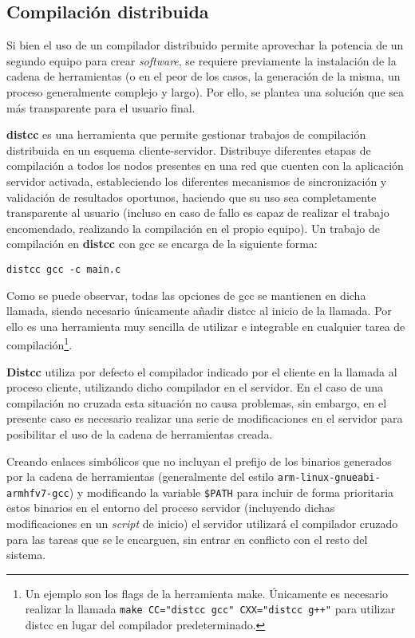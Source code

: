 \subsection{Compilación distribuida}

Si bien el uso de un compilador distribuido permite aprovechar la potencia de un segundo equipo para crear \textit{software}, se requiere previamente la instalación de la cadena de herramientas (o en el peor de los casos, la generación de la misma, un proceso generalmente complejo y largo). Por ello, se plantea una solución que sea más transparente para el usuario final.

\textbf{distcc} es una herramienta que permite gestionar trabajos de compilación distribuida en un esquema cliente-servidor. Distribuye diferentes etapas de compilación a todos los nodos presentes en una red que cuenten con la aplicación servidor activada, estableciendo los diferentes mecanismos de sincronización y validación de resultados oportunos, haciendo que su uso sea completamente transparente al usuario (incluso en caso de fallo es capaz de realizar el trabajo encomendado, realizando la compilación en el propio equipo). Un trabajo de compilación en \textbf{distcc} con gcc se encarga de la siguiente forma:

\texttt{distcc gcc -c main.c}

Como se puede observar, todas las opciones de gcc se mantienen en dicha llamada, siendo necesario únicamente añadir distcc al inicio de la llamada. Por ello es una herramienta muy sencilla de utilizar e integrable en cualquier tarea de compilación\footnote{Un ejemplo son los flags de la herramienta make. Únicamente es necesario realizar la llamada \texttt{make CC="distcc gcc" CXX="distcc g++"} para utilizar distcc en lugar del compilador predeterminado.}.

\textbf{Distcc} utiliza por defecto el compilador indicado por el cliente en la llamada al proceso cliente, utilizando dicho compilador en el servidor. En el caso de una compilación no cruzada esta situación no causa problemas, sin embargo, en el presente caso es necesario realizar una serie de modificaciones en el servidor para posibilitar el uso de la cadena de herramientas creada.

Creando enlaces simbólicos que no incluyan el prefijo de los binarios generados por la cadena de herramientas (generalmente del estilo \texttt{arm-linux-gnueabi-armhfv7-gcc}) y modificando la variable \texttt{\$PATH} para incluir de forma prioritaria estos binarios en el entorno del proceso servidor (incluyendo dichas modificaciones en un \textit{script} de inicio) el servidor utilizará el compilador cruzado para las tareas que se le encarguen, sin entrar en conflicto con el resto del sistema.


